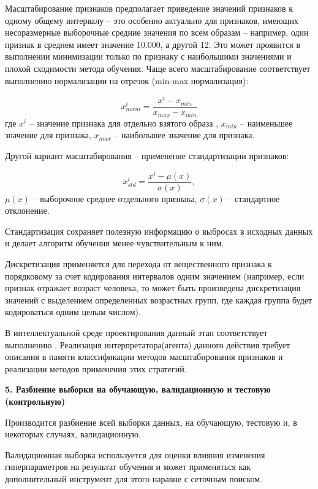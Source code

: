 Масштабирование признаков предполагает приведение значений признаков к одному общему интервалу -- это особенно актуально для признаков, имеющих несоразмерные выборочные средние значения по всем образам -- например, один признак в среднем имеет значение 10.000, а другой 12. Это может проявится в выполнении минимизации только по признаку с наибольшими значениями и плохой сходимости метода обучения. Чаще всего масштабирование соответствует выполнению нормализации на отрезок (min-max нормализация):

\begin{equation*}
	x_{norm}^i = \frac{x^i - x_{min}}{x_{max} - x_{min}}
\end{equation*}
где $x^i$ -- значение признака для отдельно взятого образа , $x_{min}$ -- наименьшее значение для признака, $x_{max}$ -- наибольшее значение для признака.

Другой вариант масштабирования -- применение стандартизации признаков:

\begin{equation*}
	x_{std}^i = \frac{x^i - \mu(x)}{\sigma(x)},
\end{equation*}
$\mu(x)$ -- выборочное среднее отдельного признака, $\sigma(x)$ -- стандартное отклонение.

Стандартизация сохраняет полезную информацию о выбросах в исходных данных и делает алгоритм обучения менее чувствительным к ним.

Дискретизация применяется для перехода от вещественного признака к порядковому за счет кодирования интервалов одним значением (например, если признак отражает возраст человека, то может быть произведена дискретизация значений с выделением определенных возрастных групп, где каждая группа будет кодироваться одним целым числом).

В интеллектуальной среде проектирования данный этап соответствует выполнению . Реализация интерпретатора(агента) данного действия требует описания в памяти классификации методов масштабирования признаков и реализации методов применения этих стратегий.


\textbf{5. Разбиение выборки на обучающую, валидационную и тестовую (контрольную)}

Производится разбиение всей выборки данных, на обучающую, тестовую и, в некоторых случаях, валидационную.

Валидационная выборка используется для оценки влияния изменения гиперпараметров на результат обучения и может применяться как дополнительный инструмент для этого наравне с сеточным поиском.

